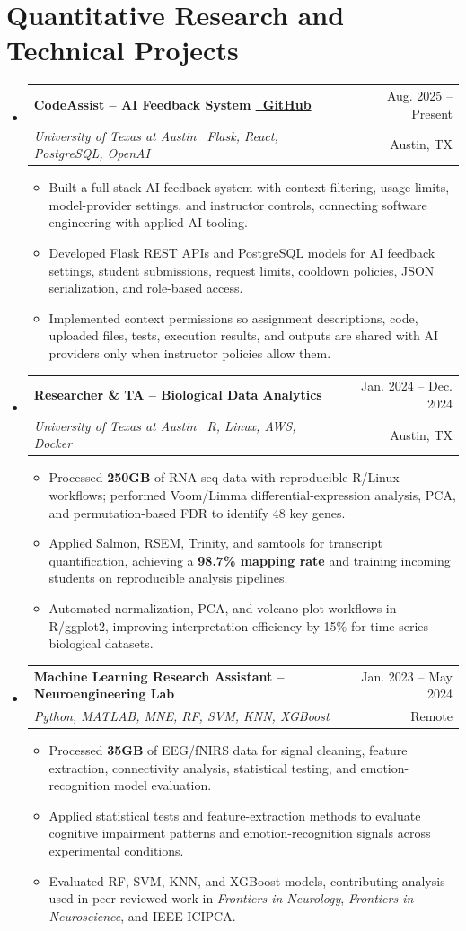 \documentclass[letterpaper,10pt]{article}
\makeatletter
\newcommand{\resumeItem}[1]{\item\footnotesize{#1\vspace{-2.5pt}}}
\newcommand{\resumeSubheading}[4]{
  \vspace{-2pt}\item
    \begin{tabular*}{0.985\textwidth}[t]{l@{\extracolsep{\fill}}r}
      \textbf{#1} & \small #2 \\
      \textit{\small #3} & \small #4 \\
    \end{tabular*}\vspace{-4pt}
}
\newcommand{\resumeSubHeadingListStart}{\begin{itemize}[leftmargin=0.11in,label={}]}
\newcommand{\resumeSubHeadingListEnd}{\end{itemize}\vspace{-2pt}}
\newcommand{\resumeItemListStart}{\begin{itemize}[leftmargin=0.17in,itemsep=0.6pt,topsep=1pt,label={$\bullet$}]}
\newcommand{\resumeItemListEnd}{\end{itemize}\vspace{1pt}}
\makeatother
\begin{document}
\section{Quantitative Research and Technical Projects}
\resumeSubHeadingListStart
\resumeSubheading{CodeAssist -- AI Feedback System \href{https://github.com/kiat/codeAssist}{\textbar\ GitHub}}{Aug. 2025 -- Present}{University of Texas at Austin \textbar\ Flask, React, PostgreSQL, OpenAI}{Austin, TX}
\resumeItemListStart
\resumeItem{Built a full-stack AI feedback system with context filtering, usage limits, model-provider settings, and instructor controls, connecting software engineering with applied AI tooling.}
\resumeItem{Developed Flask REST APIs and PostgreSQL models for AI feedback settings, student submissions, request limits, cooldown policies, JSON serialization, and role-based access.}
\resumeItem{Implemented context permissions so assignment descriptions, code, uploaded files, tests, execution results, and outputs are shared with AI providers only when instructor policies allow them.}
\resumeItemListEnd

\resumeSubheading{Researcher \& TA -- Biological Data Analytics}{Jan. 2024 -- Dec. 2024}{University of Texas at Austin \textbar\ R, Linux, AWS, Docker}{Austin, TX}
\resumeItemListStart
\resumeItem{Processed \textbf{250GB} of RNA-seq data with reproducible R/Linux workflows; performed Voom/Limma differential-expression analysis, PCA, and permutation-based FDR to identify 48 key genes.}
\resumeItem{Applied Salmon, RSEM, Trinity, and samtools for transcript quantification, achieving a \textbf{98.7\% mapping rate} and training incoming students on reproducible analysis pipelines.}
\resumeItem{Automated normalization, PCA, and volcano-plot workflows in R/ggplot2, improving interpretation efficiency by 15\% for time-series biological datasets.}
\resumeItemListEnd

\resumeSubheading{Machine Learning Research Assistant -- Neuroengineering Lab}{Jan. 2023 -- May 2024}{Python, MATLAB, MNE, RF, SVM, KNN, XGBoost}{Remote}
\resumeItemListStart
\resumeItem{Processed \textbf{35GB} of EEG/fNIRS data for signal cleaning, feature extraction, connectivity analysis, statistical testing, and emotion-recognition model evaluation.}
\resumeItem{Applied statistical tests and feature-extraction methods to evaluate cognitive impairment patterns and emotion-recognition signals across experimental conditions.}
\resumeItem{Evaluated RF, SVM, KNN, and XGBoost models, contributing analysis used in peer-reviewed work in \textit{Frontiers in Neurology}, \textit{Frontiers in Neuroscience}, and IEEE ICIPCA.}
\resumeItemListEnd
\resumeSubHeadingListEnd
\end{document}
